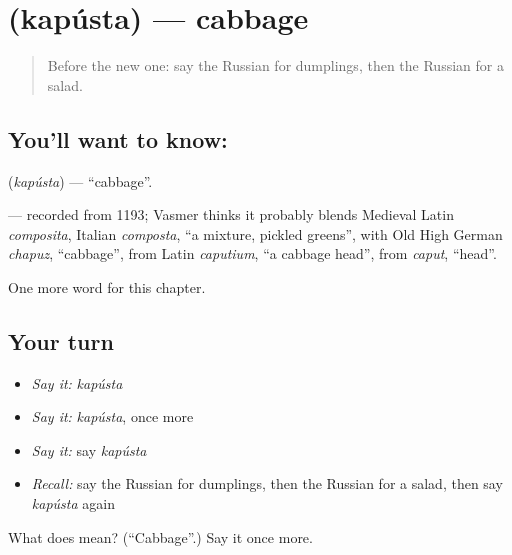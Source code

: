\section[\texorpdfstring{\ru{капуста} (kapústa)}{капуста (kapústa)}]{ (kapústa) — cabbage}

\label{lesson:RU-C194-kapusta}



\begin{quote}
Before the new one: say the Russian for dumplings, then the Russian for a salad.
\end{quote}

\subsection*{You'll want to know: }
\textbf{} (\emph{kapústa}) — \textquotedblleft{}cabbage\textquotedblright{}.

\begin{cousinweb}
\textbf{} — recorded from 1193; Vasmer thinks it probably blends Medieval Latin \emph{composita}, Italian \emph{composta}, \textquotedblleft{}a mixture, pickled greens\textquotedblright{}, with Old High German \emph{chapuz}, \textquotedblleft{}cabbage\textquotedblright{}, from Latin \emph{caputium}, \textquotedblleft{}a cabbage head\textquotedblright{}, from \emph{caput}, \textquotedblleft{}head\textquotedblright{}.
\end{cousinweb}

\begin{grammarlens}[title={What you've built}]
One more word for this chapter.
\end{grammarlens}

\subsection*{Your turn}
\begin{itemize}
\raggedright
  \item \emph{Say it:} \emph{kapústa}
  \item \emph{Say it:} \emph{kapústa}, once more
  \item \emph{Say it:} say \emph{kapústa}
  \item \emph{Recall:} say the Russian for dumplings, then the Russian for a salad, then say \emph{kapústa} again
\end{itemize}

\begin{tcolorbox}[breakable,colback=teal!4,colframe=teal!35!black,title={Before you move on}]
What does  mean? (\textquotedblleft{}Cabbage\textquotedblright{}.) Say it once more.
\end{tcolorbox}
